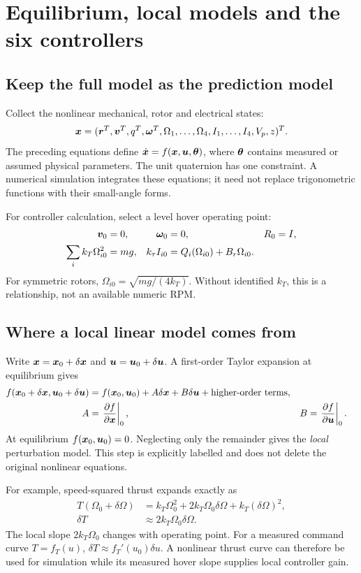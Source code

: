 \chapter{Equilibrium, local models and the six controllers}
\section{Keep the full model as the prediction model}
Collect the nonlinear mechanical, rotor and electrical states:
\begin{equation}
\bm{x}=(\bm{r}^T,\bm{v}^T,q^T,\bm{\omega}^T,
\Omega_1,\ldots,\Omega_4,I_1,\ldots,I_4,V_p,z)^T.
\end{equation}
The preceding equations define $\dot{\bm{x}}=f(\bm{x},\bm{u},\bm{\theta})$,
where $\bm{\theta}$ contains measured or assumed physical parameters. The unit
quaternion has one constraint. A numerical simulation integrates these equations;
it need not replace trigonometric functions with their small-angle forms.

For controller calculation, select a level hover operating point:
\begin{align}
\bm{v}_0&=0,&\bm{\omega}_0&=0,&R_0&=I,\\
\sum_i k_T\Omega_{i0}^2&=mg,&
k_\tau I_{i0}&=Q_i(\Omega_{i0})+B_r\Omega_{i0}.
\end{align}
For symmetric rotors, $\Omega_{i0}=\sqrt{mg/(4k_T)}$.
Without identified $k_T$, this is a relationship, not an available numeric RPM.

\section{Where a local linear model comes from}
Write $\bm{x}=\bm{x}_0+\delta\bm{x}$ and $\bm{u}=\bm{u}_0+\delta\bm{u}$.
A first-order Taylor expansion at equilibrium gives
\begin{align}
f(\bm{x}_0+\delta\bm{x},\bm{u}_0+\delta\bm{u})
&=f(\bm{x}_0,\bm{u}_0)
+A\delta\bm{x}+B\delta\bm{u}+\text{higher-order terms},\\
A&=\left.\frac{\partial f}{\partial\bm{x}}\right|_0,&
B&=\left.\frac{\partial f}{\partial\bm{u}}\right|_0.
\end{align}
At equilibrium $f(\bm{x}_0,\bm{u}_0)=0$. Neglecting only the remainder gives
the \emph{local} perturbation model. This step is explicitly labelled and does
not delete the original nonlinear equations.

For example, speed-squared thrust expands exactly as
\begin{align}
T(\Omega_0+\delta\Omega)
&=k_T\Omega_0^2+2k_T\Omega_0\delta\Omega+k_T(\delta\Omega)^2,\\
\delta T&\approx 2k_T\Omega_0\delta\Omega.
\end{align}
The local slope $2k_T\Omega_0$ changes with operating point.
For a measured command curve $T=f_T(u)$,
$\delta T\approx f_T'(u_0)\delta u$. A nonlinear thrust curve can therefore be
used for simulation while its measured hover slope supplies local controller gain.

